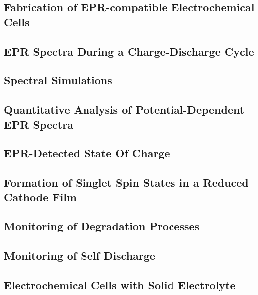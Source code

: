\subsection{Fabrication of EPR-compatible Electrochemical Cells}

\subsection{EPR Spectra During a Charge-Discharge Cycle}

\subsection{Spectral Simulations}

\subsection{Quantitative Analysis of Potential-Dependent EPR Spectra}

\subsection{EPR-Detected State Of Charge}

\subsection{Formation of Singlet Spin States in a Reduced Cathode Film}

\subsection{Monitoring of Degradation Processes}

\subsection{Monitoring of Self Discharge}

\subsection{Electrochemical Cells with Solid Electrolyte}

